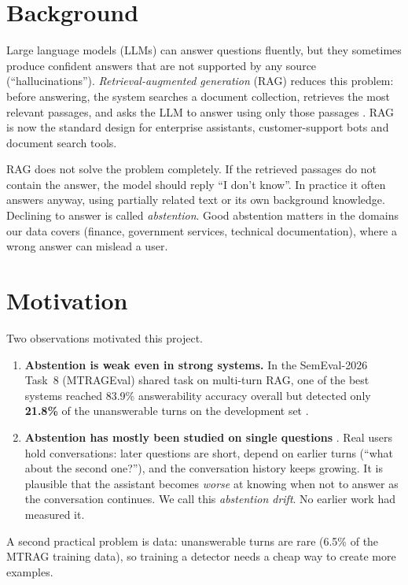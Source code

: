 \documentclass[11pt,a4paper]{report}
\begin{document}
\section{Background}
Large language models (LLMs) can answer questions fluently, but they sometimes produce confident answers that are not supported by any source (``hallucinations''). \emph{Retrieval-augmented generation} (RAG) reduces this problem: before answering, the system searches a document collection, retrieves the most relevant passages, and asks the LLM to answer using only those passages \cite{rag}. RAG is now the standard design for enterprise assistants, customer-support bots and document search tools.

RAG does not solve the problem completely. If the retrieved passages do not contain the answer, the model should reply ``I don't know''. In practice it often answers anyway, using partially related text or its own background knowledge. Declining to answer is called \emph{abstention}. Good abstention matters in the domains our data covers (finance, government services, technical documentation), where a wrong answer can mislead a user.

\section{Motivation}
Two observations motivated this project.
\begin{enumerate}
\item \textbf{Abstention is weak even in strong systems.} In the SemEval-2026 Task~8 (MTRAGEval) shared task on multi-turn RAG, one of the best systems reached 83.9\% answerability accuracy overall but detected only \textbf{21.8\%} of the unanswerable turns on the development set \cite{ails}.
\item \textbf{Abstention has mostly been studied on single questions} \cite{squad2,rgb,wen2025,feng}. Real users hold conversations: later questions are short, depend on earlier turns (``what about the second one?''), and the conversation history keeps growing. It is plausible that the assistant becomes \emph{worse} at knowing when not to answer as the conversation continues. We call this \emph{abstention drift}. No earlier work had measured it.
\end{enumerate}
A second practical problem is data: unanswerable turns are rare (6.5\% of the MTRAG training data), so training a detector needs a cheap way to create more examples.
\end{document}
